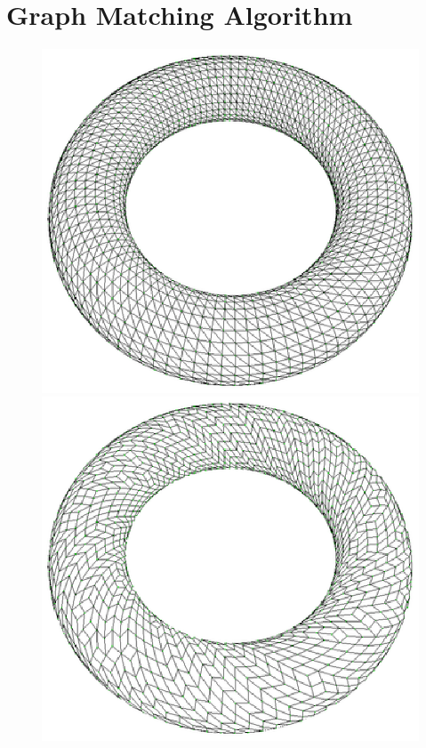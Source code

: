 \documentclass[11pt, a4paper]{paper}
\begin{document}
\section { Graph Matching Algorithm }

\begin{figure}
\includegraphics[scale=0.33]{torus1.eps}
\includegraphics[scale=0.33]{torus2.eps}

\end{figure}
\end{document}
